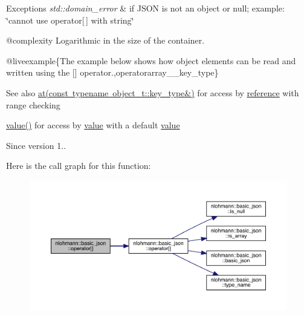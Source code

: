 \begin{DoxyExceptions}{Exceptions}
{\em std\+::domain\+\_\+error} & if J\+S\+ON is not an object or null; example\+: {\ttfamily \char`\"{}cannot use operator\mbox{[}$\,$\mbox{]} with string\char`\"{}}\\
\hline
\end{DoxyExceptions}
@complexity Logarithmic in the size of the container.

@liveexample\{The example below shows how object elements can be read and written using the {\ttfamily \mbox{[}\mbox{]}} operator.,operatorarray\+\_\+\+\_\+key\+\_\+type\}

\begin{DoxySeeAlso}{See also}
\mbox{\hyperlink{classnlohmann_1_1basic__json_a93403e803947b86f4da2d1fb3345cf2c}{at(const typename object\+\_\+t\+::key\+\_\+type\&)}} for access by \mbox{\hyperlink{classnlohmann_1_1basic__json_ac6a5eddd156c776ac75ff54cfe54a5bc}{reference}} with range checking 

\mbox{\hyperlink{classnlohmann_1_1basic__json_af9c51328fbe1da75eca750be3009917a}{value()}} for access by \mbox{\hyperlink{classnlohmann_1_1basic__json_af9c51328fbe1da75eca750be3009917a}{value}} with a default \mbox{\hyperlink{classnlohmann_1_1basic__json_af9c51328fbe1da75eca750be3009917a}{value}}
\end{DoxySeeAlso}
\begin{DoxySince}{Since}
version 1.. 
\end{DoxySince}
Here is the call graph for this function\+:\nopagebreak
\begin{figure}[H]
\begin{center}
\leavevmode
\includegraphics[width=350pt]{classnlohmann_1_1basic__json_a1416bbec9d9a8eeca21c213cf5290868_cgraph}
\end{center}
\end{figure}
\mbox{\label{classnlohmann_1_1basic__json_ab17b18f161ecd014074790e25449094a}} 
